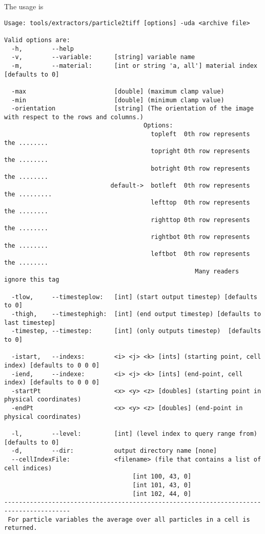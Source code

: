 \noindent The usage is
\begin{Verbatim}[fontsize=\footnotesize]
Usage: tools/extractors/particle2tiff [options] -uda <archive file>

Valid options are:
  -h,        --help
  -v,        --variable:      [string] variable name
  -m,        --material:      [int or string 'a, all'] material index [defaults to 0]

  -max                        [double] (maximum clamp value)
  -min                        [double] (minimum clamp value)
  -orientation                [string] (The orientation of the image with respect to the rows and columns.)
                                      Options:
                                        topleft  0th row represents the ........
                                        topright 0th row represents the ........
                                        botright 0th row represents the ........
                             default->  botleft  0th row represents the .........
                                        lefttop  0th row represents the ........
                                        righttop 0th row represents the ........
                                        rightbot 0th row represents the ........
                                        leftbot  0th row represents the ........
                                                    Many readers ignore this tag

  -tlow,     --timesteplow:   [int] (start output timestep) [defaults to 0]
  -thigh,    --timestephigh:  [int] (end output timestep) [defaults to last timestep]
  -timestep, --timestep:      [int] (only outputs timestep)  [defaults to 0]

  -istart,   --indexs:        <i> <j> <k> [ints] (starting point, cell index) [defaults to 0 0 0]
  -iend,     --indexe:        <i> <j> <k> [ints] (end-point, cell index) [defaults to 0 0 0]
  -startPt                    <x> <y> <z> [doubles] (starting point in physical coordinates)
  -endPt                      <x> <y> <z> [doubles] (end-point in physical coordinates)

  -l,        --level:         [int] (level index to query range from) [defaults to 0]
  -d,        --dir:           output directory name [none]
  --cellIndexFile:            <filename> (file that contains a list of cell indices)
                                   [int 100, 43, 0]
                                   [int 101, 43, 0]
                                   [int 102, 44, 0]
----------------------------------------------------------------------------------------
 For particle variables the average over all particles in a cell is returned.
 \end{Verbatim}

